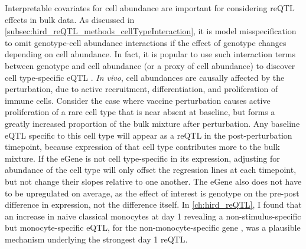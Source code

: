 Interpretable covariates for cell abundance are important for considering \gls{reQTL} effects in bulk data.
As discussed in \cref{subsec:hird_reQTL_methods_cellTypeInteraction}, 
it is model misspecification to omit genotype-cell abundance interactions if the effect of genotype changes depending on cell abundance.
In fact, it is popular to use such interaction terms between genotype and cell abundance (or a proxy of cell abundance) 
to discover cell type-specific \gls{eQTL} \autocite{westra2015CellSpecificEQTL,kim-hellmuth2020CellTypeSpecific}.
\textit{In vivo}, cell abundances are causally affected by the perturbation, due to active recruitment, differentiation, and proliferation of immune cells.
Consider the case where vaccine perturbation causes active proliferation of a rare cell type that is near absent at baseline, 
but forms a greatly increased proportion of the bulk mixture after perturbation.
Any baseline \gls{eQTL} specific to this cell type will appear as a \gls{reQTL} in the post-perturbation timepoint, 
because expression of that cell type contributes more to the bulk mixture.
If the eGene is not cell type-specific in its expression, 
adjusting for abundance of the cell type will only offset the regression lines at each timepoint, but not change their slopes relative to one another.
The eGene also does not have to be upregulated on average, 
as the effect of interest is genotype on the pre-post difference in expression, not the difference itself.
In \cref{ch:hird_reQTL}, I found that an increase in naive classical monocytes at day 1 revealing a
non-stimulus-specific but monocyte-specific \gls{eQTL},
for the non-monocyte-specific gene ,
was a plausible mechanism underlying the strongest day 1 \gls{reQTL}.

